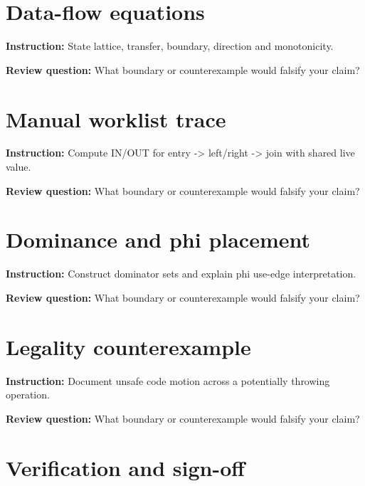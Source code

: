 \documentclass[10pt,letterpaper]{article}
\begin{document}
\section{Data-flow equations}
\textbf{Instruction:} State lattice, transfer, boundary, direction and monotonicity.\par{}
\textbf{Review question:} What boundary or counterexample would falsify your claim?\par\section{Manual worklist trace}
\textbf{Instruction:} Compute IN/OUT for entry -> left/right -> join with shared live value.\par{}
\textbf{Review question:} What boundary or counterexample would falsify your claim?\par\section{Dominance and phi placement}
\textbf{Instruction:} Construct dominator sets and explain phi use-edge interpretation.\par{}
\textbf{Review question:} What boundary or counterexample would falsify your claim?\par\section{Legality counterexample}
\textbf{Instruction:} Document unsafe code motion across a potentially throwing operation.\par{}
\textbf{Review question:} What boundary or counterexample would falsify your claim?\par\section{Verification and sign-off}
\end{document}
